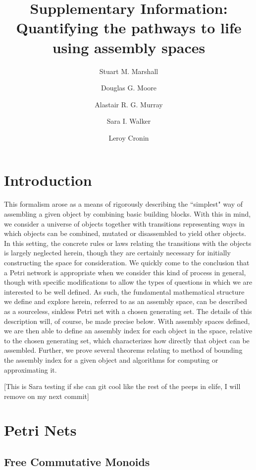 \documentclass[aps,prd,onecolumn,nofootinbib,letterpaper,preprintnumbers,superscriptaddress,eqsecnum]{revtex4}
\theoremstyle{definition}
\begin{document}
\title{Supplementary Information: Quantifying the pathways to life using assembly spaces}
\author{Stuart M. Marshall}
\author{Douglas G. Moore}
\author{Alastair R. G. Murray}
\author{Sara I. Walker}
\author{Leroy Cronin}

\maketitle

\section{Introduction}

This formalism arose as a means of rigorously describing the ``simplest" way of assembling a given object by combining basic building blocks.
With this in mind, we consider a universe of objects together with transitions representing ways in which objects can be combined, mutated or disassembled to yield other objects.
In this setting, the concrete rules or laws relating the transitions with the objects is largely neglected herein, though they are certainly necessary for initially constructing the space for consideration.
We quickly come to the conclusion that a Petri network is appropriate when we consider this kind of process in general, though with specific modifications to allow the types of questions in which we are interested to be well defined.
As such, the fundamental mathematical structure we define and explore herein, referred to as an assembly space, can be described as a sourceless, sinkless Petri net with a chosen generating set.
The details of this description will, of course, be made precise below.
With assembly spaces defined, we are then able to define an assembly index for each object in the space, relative to the chosen generating set, which characterizes how directly that object can be assembled.
Further, we prove several theorems relating to method of bounding the assembly index for a given object and algorithms for computing or approximating it.

[This is Sara testing if she can git cool like the rest of the peeps in elife, I will remove on my next commit]

\section{Petri Nets}\label{sec:petri-nets}

\subsection{Free Commutative Monoids}\label{subsec:fcm}
\end{document}
